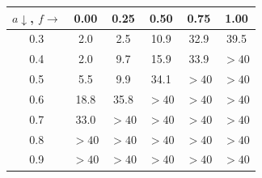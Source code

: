 \begin{tabular}{c|ccccc}
\toprule
$a \downarrow$, $f \rightarrow$ & 0.00 & 0.25 & 0.50 & 0.75 & 1.00 \\
\midrule
0.3 & 2.0 & 2.5 & 10.9 & 32.9 & 39.5 \\
0.4 & 2.0 & 9.7 & 15.9 & 33.9 & $>40$ \\
0.5 & 5.5 & 9.9 & 34.1 & $>40$ & $>40$ \\
0.6 & 18.8 & 35.8 & $>40$ & $>40$ & $>40$ \\
0.7 & 33.0 & $>40$ & $>40$ & $>40$ & $>40$ \\
0.8 & $>40$ & $>40$ & $>40$ & $>40$ & $>40$ \\
0.9 & $>40$ & $>40$ & $>40$ & $>40$ & $>40$ \\
\bottomrule
\end{tabular}